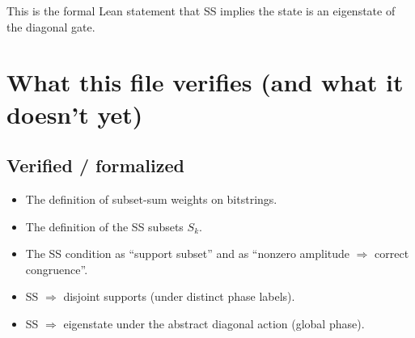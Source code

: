 \documentclass[11pt]{article}
\begin{document}
This is the formal Lean statement that SS implies the state is an eigenstate of the diagonal gate.

\section*{What this file verifies (and what it doesn’t yet)}

\subsection*{Verified / formalized}

\begin{itemize}
\item The definition of subset-sum weights on bitstrings.
\item The definition of the SS subsets $S_k$.
\item The SS condition as “support subset” and as “nonzero amplitude $\Rightarrow$ correct congruence”.
\item SS $\Rightarrow$ disjoint supports (under distinct phase labels).
\item SS $\Rightarrow$ eigenstate under the abstract diagonal action (global phase).
\end{itemize}
\end{document}

